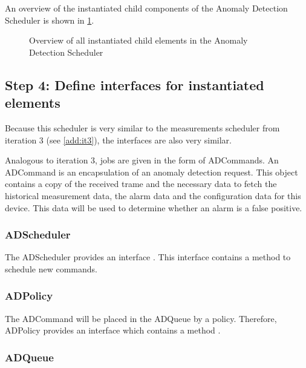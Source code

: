 \npar An overview of the instantiated child components of the Anomaly Detection
Scheduler is shown in \ref{fig:it5/elements}.

\begin{figure}[H]
	\begin{centering}
		\caption{Overview of all instantiated child elements in the Anomaly
		Detection Scheduler}
		\label{fig:it5/elements}
	\end{centering}
\end{figure}

\subsection{Step 4: Define interfaces for instantiated elements}
\label{add:it5/interfaces}

\npar Because this scheduler is very similar to the measurements scheduler from
iteration 3 (see \ref{add:it3}), the interfaces are also very similar. 

\npar Analogous to iteration 3, jobs are given in the form of ADCommands. An
ADCommand is an encapsulation of an anomaly detection request. This object
contains a copy of the received trame and the necessary data to fetch the
historical measurement data, the alarm data and the configuration data for this
device. This data will be used to determine whether an alarm is a false positive. 

\subsubsection{ADScheduler}

\npar The ADScheduler provides an interface
. This interface contains a method
 to schedule new commands.

\subsubsection{ADPolicy}

\npar The ADCommand will be placed in the ADQueue by a policy. Therefore,
ADPolicy provides an interface  which contains a method
.

\subsubsection{ADQueue}

